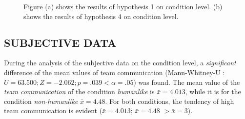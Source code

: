 \documentclass[sigchi]{acmart}
\begin{document}
\begin{figure}[]
  \centering
  \qquad
  \caption[Results of hypothesis 1 and 4]{Figure (a) shows the results of hypothesis 1 on condition level. (b) shows the results of hypothesis 4 on condition level.}
  \label{H1H4}
\end{figure}

\newpage
\subsection{SUBJECTIVE DATA}
During the analysis of the subjective data on the condition level, a \textit{significant} difference of the mean values of team communication (Mann-Whitney-U : $U = 63.500; Z = -2.062; p =.039 < \alpha = .05$) was found. The mean value of the \textit{team communication} of the condition \textit{humanlike} is $\bar{x} = 4.013$, while it is for the condition \textit{non-humanlike} $\bar{x} = 4.48$. For both conditions, the tendency of high team communication is evident ($\bar{x} = 4.013$; $\bar{x} = 4.48$ $ > \bar{x} = 3$).
\end{document}
